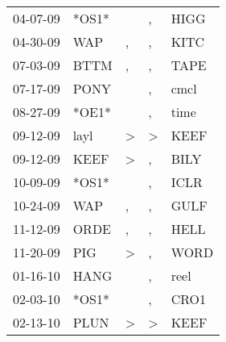 \begin{supertabular}{p{0.07\textwidth}p{0.06\textwidth}p{0.02\textwidth}p{0.02\textwidth}p{0.06\textwidth}}
          04-07-09\textsuperscript{} &                            *OS1* &                  &                , &           HIGG\textsuperscript{} \\
          04-30-09\textsuperscript{} &            WAP\textsuperscript{} &                , &                , &           KITC\textsuperscript{} \\
          07-03-09\textsuperscript{} &           BTTM\textsuperscript{} &                , &                , &           TAPE\textsuperscript{} \\
          07-17-09\textsuperscript{} &           PONY\textsuperscript{} &                  &                , &           cmcl\textsuperscript{} \\
          08-27-09\textsuperscript{} &                            *OE1* &                  &                , &           time\textsuperscript{} \\
          09-12-09\textsuperscript{} &           layl\textsuperscript{} &     \textgreater &     \textgreater &           KEEF\textsuperscript{} \\
          09-12-09\textsuperscript{} &           KEEF\textsuperscript{} &     \textgreater &                , &           BILY\textsuperscript{} \\
          10-09-09\textsuperscript{} &                            *OS1* &                  &                , &           ICLR\textsuperscript{} \\
          10-24-09\textsuperscript{} &            WAP\textsuperscript{} &                , &                , &           GULF\textsuperscript{} \\
          11-12-09\textsuperscript{} &           ORDE\textsuperscript{} &                , &                , &           HELL\textsuperscript{} \\
          11-20-09\textsuperscript{} &            PIG\textsuperscript{} &     \textgreater &                , &           WORD\textsuperscript{} \\
          01-16-10\textsuperscript{} &           HANG\textsuperscript{} &                  &                , &           reel\textsuperscript{} \\
          02-03-10\textsuperscript{} &                            *OS1* &                  &                , &           CRO1\textsuperscript{} \\
          02-13-10\textsuperscript{} &           PLUN\textsuperscript{} &     \textgreater &     \textgreater &           KEEF\textsuperscript{} \\

\end{supertabular}
